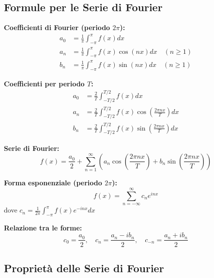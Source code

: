 \subsection{Formule per le Serie di Fourier}

\begin{info}
\textbf{Coefficienti di Fourier (periodo $2\pi$):}
\begin{align}
a_0 &= \frac{1}{\pi} \int_{-\pi}^{\pi} f(x) dx \\
a_n &= \frac{1}{\pi} \int_{-\pi}^{\pi} f(x) \cos(nx) dx \quad (n \geq 1) \\
b_n &= \frac{1}{\pi} \int_{-\pi}^{\pi} f(x) \sin(nx) dx \quad (n \geq 1)
\end{align}

\textbf{Coefficienti per periodo $T$:}
\begin{align}
a_0 &= \frac{2}{T} \int_{-T/2}^{T/2} f(x) dx \\
a_n &= \frac{2}{T} \int_{-T/2}^{T/2} f(x) \cos\left(\frac{2\pi nx}{T}\right) dx \\
b_n &= \frac{2}{T} \int_{-T/2}^{T/2} f(x) \sin\left(\frac{2\pi nx}{T}\right) dx
\end{align}

\textbf{Serie di Fourier:}
\[ f(x) = \frac{a_0}{2} + \sum_{n=1}^{\infty} \left(a_n \cos\left(\frac{2\pi nx}{T}\right) + b_n \sin\left(\frac{2\pi nx}{T}\right)\right) \]

\textbf{Forma esponenziale (periodo $2\pi$):}
\[ f(x) = \sum_{n=-\infty}^{\infty} c_n e^{inx} \]
dove $c_n = \frac{1}{2\pi} \int_{-\pi}^{\pi} f(x) e^{-inx} dx$

\textbf{Relazione tra le forme:}
\[ c_0 = \frac{a_0}{2}, \quad c_n = \frac{a_n - ib_n}{2}, \quad c_{-n} = \frac{a_n + ib_n}{2} \]
\end{info}

\subsection{Proprietà delle Serie di Fourier}

